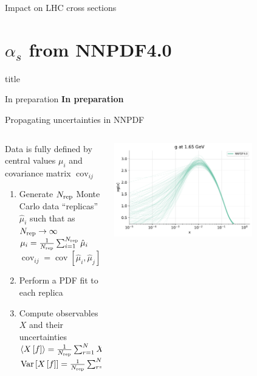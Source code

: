 \documentclass[8pt,t]{beamer}
\newcommand{\SectionTitleFrame}[1][]{%
  \begin{frame}
    \vfill
    \centering
    \begin{beamercolorbox}[sep=8pt,center,shadow=true,rounded=true]{title}
      \usebeamerfont{title}\insertsection\par
    \end{beamercolorbox}
    \ifx\relax#1\relax\else
      \vspace{0.5cm}
      \textbf{#1}
    \fi
    \vfill
  \end{frame}
}
\begin{document}
\begin{frame}{Impact on LHC cross sections}
\end{frame}


\section*{$\alpha_s$ from NNPDF4.0}
\SectionTitleFrame[In preparation]

\begin{frame}{Propagating uncertainties in NNPDF}
  \begin{columns}
    \begin{column}{0.49\textwidth}
      Data is fully defined by central values $\mu_i$ and covariance matrix $\operatorname{cov}_{ij}$
      \begin{enumerate}
        \item Generate $N_{\rm rep}$ { Monte Carlo data} ``replicas'' $\hat{\mu}_i$ such that as $N_{\rm rep}\to \infty$ \\
        $\mu_i = \frac{1}{N_{\rm rep}}\sum_{i=1}^{N_{\rm rep}} \hat{\mu}_i$\\
        $\operatorname{cov}_{ij} = \operatorname{cov}[\hat{\mu}_i, \hat{\mu}_j]$
        \item Perform a { PDF fit} to each replica
        \item Compute observables $X$ and their uncertainties\\
        $\left\langle X\left[f\right]\right\rangle=\frac{1}{N_{\rm rep}} \sum_{r=1}^N X\left[f^{(r)}\right]$\\
        $\operatorname{Var}\left[X\left[f\right]\right] = \frac{1}{N_{\rm rep}} \sum_{r=1}^{N_{\rm rep}}\left(X\left[f^{(r)}\right]-\left\langle X\left[f\right]\right\rangle\right)^2$
      \end{enumerate}
    \end{column}
    \begin{column}{0.49\textwidth}
      \begin{center}
        \includegraphics[width=0.7\textwidth]{replicas_g.pdf}\\

\end{center}
\end{column}
\end{columns}
\end{frame}
\end{document}
